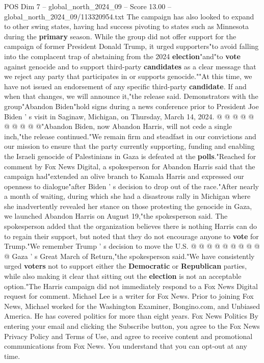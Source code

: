\begin{textsample}{POS Dim 7 – global\_north\_2024\_09 – Score 13.00 – global\_north\_2024\_09/113320954.txt}
The campaign has also looked to expand to other swing states, having had success pivoting to states such as Minnesota during the \textbf{primary} season.
While the group did not offer support for the campaign of former President Donald Trump, it urged supporters"to avoid falling into the complacent trap of abstaining from the 2024 \textbf{election}"and"to \textbf{vote} against genocide and to support third-party \textbf{candidates} as a clear message that we reject any party that participates in or supports genocide.""At this time, we have not issued an endorsement of any specific third-party \textbf{candidate}.
If and when that changes, we will announce it,"the release said.
Demonstrators with the group"Abandon Biden"hold signs during a news conference prior to President Joe Biden ' s visit in Saginaw, Michigan, on Thursday, March 14, 2024. @ @ @ @ @ @ @ @ @ @"Abandon Biden, now Abandon Harris, will not cede a single inch,"the release continued."We remain firm and steadfast in our convictions and our mission to ensure that the party currently supporting, funding and enabling the Israeli genocide of Palestinians in Gaza is defeated at the \textbf{polls}."Reached for comment by Fox News Digital, a spokesperson for Abandon Harris said that the campaign had"extended an olive branch to Kamala Harris and expressed our openness to dialogue"after Biden ' s decision to drop out of the race."After nearly a month of waiting, during which she had a disastrous rally in Michigan where she inadvertently revealed her stance on those protesting the genocide in Gaza, we launched Abandon Harris on August 19,"the spokesperson said.
The spokesperson added that the organization believes there is nothing Harris can do to regain their support, but noted that they do not encourage anyone to \textbf{vote} for Trump."We remember Trump ' s decision to move the U.S. @ @ @ @ @ @ @ @ @ @ Gaza ' s Great March of Return,"the spokesperson said."We have consistently urged \textbf{voters} not to support either the \textbf{Democratic} or \textbf{Republican} parties, while also making it clear that sitting out the \textbf{election} is not an acceptable option."The Harris campaign did not immediately respond to a Fox News Digital request for comment.
Michael Lee is a writer for Fox News.
Prior to joining Fox News, Michael worked for the Washington Examiner, Bongino.com, and Unbiased America.
He has covered politics for more than eight years.
Fox News Politics By entering your email and clicking the Subscribe button, you agree to the Fox News Privacy Policy and Terms of Use, and agree to receive content and promotional communications from Fox News.
You understand that you can opt-out at any time.

\end{textsample}
